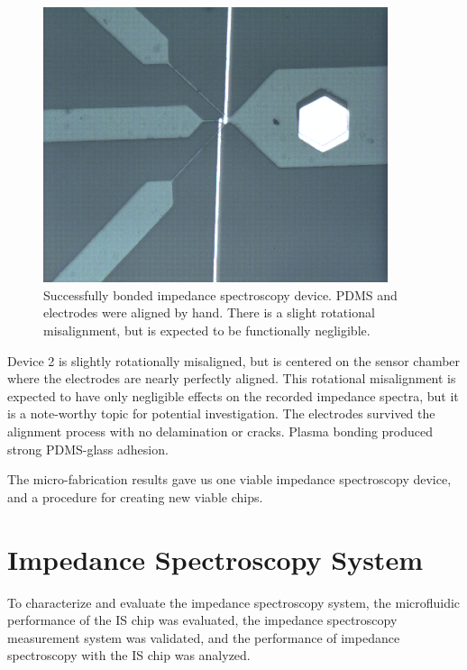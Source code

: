\begin{figure}[h]
    \centering
    \includegraphics[width=0.9\textwidth]{images/good_device.png}
    \caption{Successfully bonded impedance spectroscopy device. PDMS and electrodes were aligned by hand. There is a slight rotational misalignment, but is expected to be functionally negligible.}
    \label{fig:good_device}
\end{figure} 

\par Device 2 is slightly rotationally misaligned, but is centered on the sensor chamber where the electrodes are nearly perfectly aligned. This rotational misalignment is expected to have only negligible effects on the recorded impedance spectra, but it is a note-worthy topic for potential investigation. The electrodes survived the alignment process with no delamination or cracks. Plasma bonding produced strong PDMS-glass adhesion. 

\par The micro-fabrication results gave us one viable impedance spectroscopy device, and a procedure for creating new viable chips.

\FloatBarrier

\section{Impedance Spectroscopy System}

\par To characterize and evaluate the impedance spectroscopy system, the microfluidic performance of the IS chip was evaluated, the impedance spectroscopy measurement system was validated, and the performance of impedance spectroscopy with the IS chip was analyzed. 

